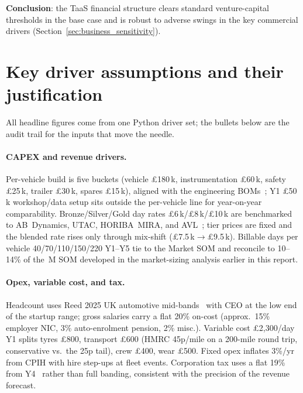 \noindent \textbf{Conclusion}: the TaaS financial structure clears
standard venture-capital thresholds in the base case and is
robust to adverse swings in the key commercial drivers
(Section~\ref{sec:business_sensitivity}).

\section{Key driver assumptions and their justification}
\label{ch:intro}
\label{sec:why_taas}
\label{sec:assumptions}

All headline figures come from one Python driver set; the bullets
below are the audit trail for the inputs that move the needle.

\paragraph{CAPEX and revenue drivers.} Per-vehicle build
\capexPerVehicle{} is five buckets (vehicle \pounds180\,k,
instrumentation \pounds60\,k, safety \pounds25\,k, trailer
\pounds30\,k, spares \pounds15\,k), aligned with the engineering
BOMs~\cite{mcconnell_engineering,xing_engineering,jiang_engineering,vogelberg_engineering}; Y1
\pounds50\,k workshop/data setup sits outside the per-vehicle line
for year-on-year comparability. Bronze/Silver/Gold day rates
\pounds6\,k/\pounds8\,k/\pounds10\,k are benchmarked to
AB~Dynamics, UTAC, HORIBA~MIRA, and AVL~\cite{abdynamics_ar2024,utac_facilities,horiba_brake,avl_profile};
tier prices are fixed and the blended rate rises only through
mix-shift (\pounds7.5\,k$\to$\pounds9.5\,k). Billable days per
vehicle 40/70/110/150/220 Y1--Y5 tie to the Market SOM
\cite{mcconnell_business} and reconcile \yFiveRevenue{} to
10--14\% of the \,M SOM developed in the market-sizing analysis earlier in this report.

\paragraph{Opex, variable cost, and tax.} Headcount uses Reed 2025
UK automotive mid-bands~\cite{reed_salaries_2025} with CEO at the
low end of the startup range; gross salaries carry a flat 20\%
on-cost (approx.\ 15\% employer NIC, 3\% auto-enrolment pension,
2\% misc.). Variable cost \pounds2{,}300/day Y1 splits tyres
\pounds800, transport \pounds600 (HMRC 45p/mile on a 200-mile
round trip, conservative vs.\ the 25p tail), crew \pounds400, wear
\pounds500. Fixed opex inflates 3\%/yr from CPIH
\cite{ons_cpi_2025} with hire step-ups at fleet events. Corporation
tax uses a flat 19\% from Y4~\cite{hmrc_corp_tax} rather than full
banding, consistent with the precision of the revenue forecast.

